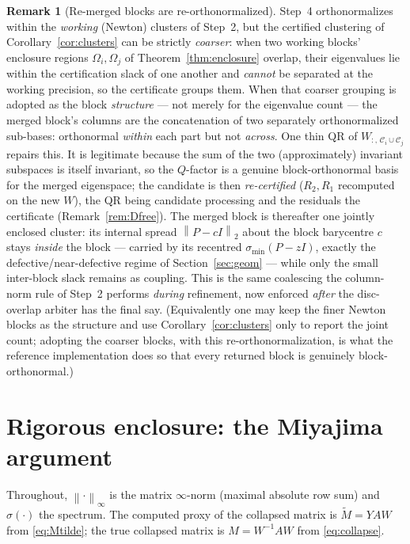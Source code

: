 \documentclass[11pt,a4paper]{article}
\newcommand{\norm}[1]{\left\|#1\right\|}
\newcommand{\spec}{\sigma}
\theoremstyle{plain}
\theoremstyle{definition}
\newtheorem{remark}[theorem]{Remark}
\begin{document}
\begin{remark}[Re-merged blocks are re-orthonormalized]\label{rem:remerge}
Step~4 orthonormalizes within the \emph{working} (Newton) clusters of Step~2, but the
certified clustering of Corollary~\ref{cor:clusters} can be strictly \emph{coarser}: when
two working blocks' enclosure regions $\Omega_i,\Omega_j$ of
Theorem~\ref{thm:enclosure} overlap, their eigenvalues lie within the certification slack of
one another and \emph{cannot} be separated at the working precision, so the certificate groups
them. When that coarser grouping is adopted as the block \emph{structure} --- not merely for
the eigenvalue count --- the merged block's columns are the concatenation of two separately
orthonormalized sub-bases: orthonormal \emph{within} each part but not \emph{across}. One thin
QR of $W_{:,\,\mathcal C_i\cup\mathcal C_j}$ repairs this. It is legitimate because the sum of
the two (approximately) invariant subspaces is itself invariant, so the $Q$-factor is a genuine
block-orthonormal basis for the merged eigenspace; the candidate is then \emph{re-certified}
($R_2,R_1$ recomputed on the new $W$), the QR being candidate processing and the residuals the
certificate (Remark~\ref{rem:Dfree}). The merged block is thereafter one jointly enclosed
cluster: its internal spread $\norm{P-cI}_2$ about the block barycentre $c$ stays \emph{inside}
the block --- carried by its recentred $\sigma_{\min}(P-zI)$, exactly the defective/near-defective
regime of Section~\ref{sec:geom} --- while only the small inter-block slack remains as coupling.
This is the same coalescing the column-norm rule of Step~2 performs \emph{during} refinement,
now enforced \emph{after} the disc-overlap arbiter has the final say. (Equivalently one may keep
the finer Newton blocks as the structure and use Corollary~\ref{cor:clusters} only to report the
joint count; adopting the coarser blocks, with this re-orthonormalization, is what the reference
implementation does so that every returned block is genuinely block-orthonormal.)
\end{remark}

\section{Rigorous enclosure: the Miyajima argument}\label{sec:rigor}

Throughout, $\norm{\cdot}_\infty$ is the matrix $\infty$-norm (maximal absolute row
sum) and $\spec(\cdot)$ the spectrum. The computed proxy of the collapsed matrix is
$\widetilde M = YAW$ from \eqref{eq:Mtilde}; the true collapsed matrix is $M=W^{-1}AW$
from \eqref{eq:collapse}.
\end{document}
